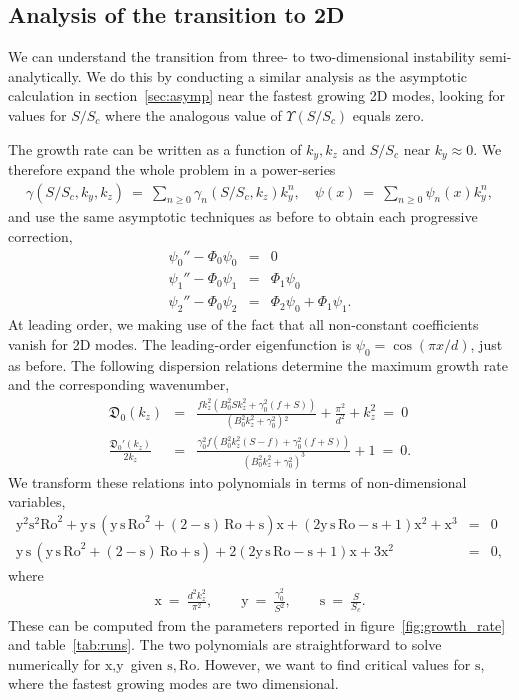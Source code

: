 \documentclass{rsproca_new}%
\newcommand{\SSC}{S/S_{c}}
\newcommand\Beq{\begin{eqnarray}}
\newcommand\Eeq{\end{eqnarray}}
\newcommand{\Ro}{\mathrm{Ro}}
\newcommand{\s}{\text{s}}
\newcommand{\x}{\text{x}}
\newcommand{\y}{\text{y}}
\begin{document}
\subsection{Analysis of the transition to 2D}
\label{sec:2D_transition}

We can understand the transition from three- to two-dimensional instability semi-analytically. We do this by conducting a similar analysis as the asymptotic calculation in section~\ref{sec:asymp} near the fastest growing 2D modes, looking for values for $\SSC$ where the analogous value of $\Upsilon(\SSC)$ equals zero. 

The growth rate can be written as a function of  $k_{y},k_{z}$ and $\SSC$ near $k_{y} \approx0$.  We therefore expand the whole problem in a power-series 
\Beq
\gamma(\SSC,k_{y},k_{z}) \ = \   \sum_{n\ge 0} \gamma_{n}(\SSC,k_{z}) k_{y}^{n}, \quad \psi(x) \ = \ \sum_{n\ge 0} \psi_{n}(x) k_{y}^{n},
\Eeq
and use the same asymptotic techniques as before to obtain each progressive correction,
\Beq
\psi_{0}'' - \Phi_{0} \psi_{0} & = & 0 \label{eq:psi0} \\
\psi_{1}'' - \Phi_{0} \psi_{1} & = & \Phi_{1} \psi_{0} \label{eq:psi1} \\
\psi_{2}'' - \Phi_{0} \psi_{2} & = & \Phi_{2} \psi_{0} + \Phi_{1} \psi_{1}.
\label{eq:psi2}  
\Eeq
At leading order, we making use of the fact that all non-constant coefficients vanish for 2D modes. The leading-order eigenfunction is $\psi_{0} = \cos(\pi x / d)$, just as before. The following dispersion relations determine the maximum growth rate and the corresponding wavenumber,
\Beq
\mathfrak{D}_{0}(k_{z}) &=& \frac{f k_z^2 \left(B_0^2 S k_z^2+\gamma _0^2 (f+S)\right)}{\left(B_0^2 k_z^2+\gamma _0^2\right){}^2}+\frac{\pi ^2}{d^2}+k_z^2 \ = \ 0 \\
\frac{\mathfrak{D}_{0}'(k_{z})}{2k_{z}} &=& \frac{\gamma _0^2 f \left(B_0^2 k_{z}^2 (S-f)+\gamma _0^2 (f+S)\right)}{\left(B_0^2 k_{z}^2+\gamma _0^2\right)^3}+1 \ = \ 0.
\Eeq
We transform these relations into polynomials in terms of non-dimensional variables,
\Beq
\label{dispersion}
\y^2 \s^2 \Ro^2 +  \y \, \s  \, ( \y \, \s \, \Ro^2 + (2  - \s)  \, \Ro + \s ) \x + ( 2 \y \,\s \,  \Ro - \s  + 1 ) \x^2 +\x^3 &=& 0 \\ 
\y \, \s  \, (\y \, \s \, \Ro^2 + (2  - \s)  \, \Ro + \s    )  + 2 ( 2 \y \,\s \,  \Ro - \s  + 1 ) \x +3\x^2 &=& 0,
\label{critical-dispersion}
\Eeq
where
\Beq
\x  \ = \ \frac{d^2 k_z^2}{\pi ^2}, \quad  \quad \y \ = \ \frac{\gamma_{0}^{2}}{S^{2}}, \quad \quad \s  \ = \ \frac{S}{S_{c}}.
\Eeq
These can be computed from the parameters reported in figure~\ref{fig:growth_rate} and table~\ref{tab:runs}.
The two polynomials are straightforward to solve numerically for $\x,\y$ given $\s, \Ro$. However, we want to find critical values for $\s$, where the fastest growing modes are two dimensional. 
\end{document}
